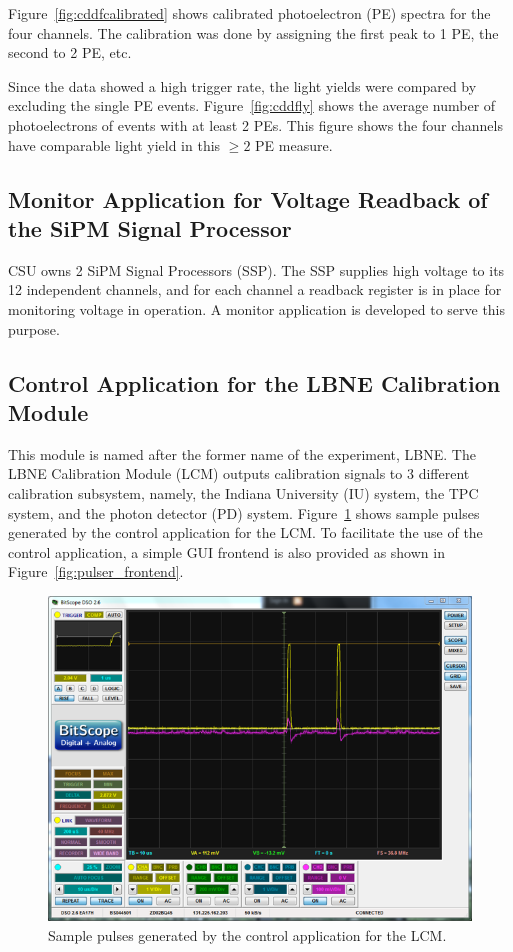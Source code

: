 \documentclass[12pt,a4paper,final]{iopart}
\begin{document}
Figure~\ref{fig:cddfcalibrated} shows calibrated photoelectron (PE) spectra for the four channels. The calibration was done by assigning the first peak to 1 PE, the second to 2 PE, etc.

Since the data showed a high trigger rate, the light yields were compared by excluding the single PE events. Figure~\ref{fig:cddfly} shows the average number of photoelectrons of events with at least 2 PEs. This figure shows the four channels have comparable light yield in this $\ge 2$ PE measure.

\subsection{Monitor Application for Voltage Readback of the SiPM Signal Processor}

CSU owns 2 SiPM Signal Processors (SSP). The SSP supplies high voltage to its 12 independent channels, and for each channel a readback register is in place for monitoring voltage in operation. A monitor application is developed to serve this purpose.

\subsection{Control Application for the LBNE Calibration Module}

This module is named after the former name of the experiment, LBNE. The LBNE Calibration Module (LCM) outputs calibration signals to 3 different calibration subsystem, namely, the Indiana University (IU) system, the TPC system, and the photon detector (PD) system. Figure~\ref{fig:pulser_pulse} shows sample pulses generated by the control application for the LCM. To facilitate the use of the control application, a simple GUI frontend is also provided as shown in Figure~\ref{fig:pulser_frontend}.

\begin{figure}
  \centering
  \includegraphics[width=.7\textwidth]{figures/pulser.jpg}
  \caption{Sample pulses generated by the control application for the LCM.}
  \label{fig:pulser_pulse}
\end{figure}
\end{document}
